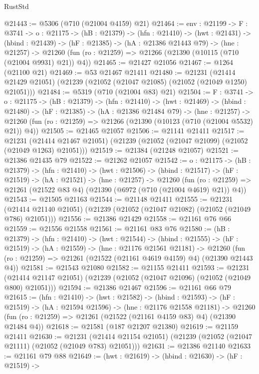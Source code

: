 \begin{lexlean}{RustStd}
\begin{coremodule}
@21443 := @5306 (@710 (@21004 @4159) @21)
@21464 := {env : @21199} ->
  {F : @3741} ->
  {o : @21175} ->
  (hB : @21379) ->
  (hfn : @21410) ->
  (hwt : @21431) ->
  (hbind : @21439) ->
  (hF : @21385) ->
  (hA : @21386 @21443 @79) ->
  (hne : @21257) ->
  @21260 (fun (ro : @21259) => @21266 (@21390 (@10115 (@710 (@21004 @9931) @21)) @4))
@21465 := @21427 @21056
@21467 := @1264 (@21100 @21)
@21469 := @53 @21467 @21411
@21480 := @21231
    (@21414 @21429 @21051)
    (@21239 (@21052 (@21047 @21085) (@21052 (@21049 @1250) @21051)))
@21484 := @5319 (@710 (@21004 @83) @21)
@21504 := {F : @3741} ->
  {o : @21175} ->
  (hB : @21379) ->
  (hfn : @21410) ->
  (hwt : @21469) ->
  (hbind : @21480) ->
  (hF : @21385) ->
  (hA : @21386 @21484 @79) ->
  (hne : @21257) ->
  @21260 (fun (ro : @21259) => @21266 (@21390 (@10123 (@710 (@21004 @5532) @21)) @4))
@21505 := @21465 @21057
@21506 := @21141 @21411
@21517 := @21231
    (@21414 @21467 @21051)
    (@21239 (@21052 (@21047 @21099) (@21052 (@21049 @1263) @21051)))
@21519 := @21384 (@21248 @21057)
@21521 := @21386 @21435 @79
@21522 := @21262 @21057
@21542 := {o : @21175} ->
  (hB : @21379) ->
  (hfn : @21410) ->
  (hwt : @21506) ->
  (hbind : @21517) ->
  (hF : @21519) ->
  (hA : @21521) ->
  (hne : @21257) ->
  @21260 (fun (ro : @21259) => @21261 (@21522 @83 @4) (@21390 (@6972 (@710 (@21004 @4619) @21)) @4))
@21543 := @21505 @21163
@21544 := @21148 @21411
@21555 := @21231
    (@21414 @21140 @21051)
    (@21239 (@21052 (@21047 @21082) (@21052 (@21049 @786) @21051)))
@21556 := @21386 @21429
@21558 := @21161 @76 @66
@21559 := @21556 @21558
@21561 := @21161 @83 @76
@21580 := (hB : @21379) ->
  (hfn : @21410) ->
  (hwt : @21544) ->
  (hbind : @21555) ->
  (hF : @21519) ->
  (hA : @21559) ->
  (hne : @21176 @21561 @21181) ->
  @21260 (fun (ro : @21259) => @21261 (@21522 (@21161 @4619 @4159) @4) (@21390 @21443 @4))
@21581 := @21543 @21080
@21582 := @21155 @21411
@21593 := @21231
    (@21414 @21147 @21051)
    (@21239 (@21052 (@21047 @21096) (@21052 (@21049 @800) @21051)))
@21594 := @21386 @21467
@21596 := @21161 @66 @79
@21615 := (hfn : @21410) ->
  (hwt : @21582) ->
  (hbind : @21593) ->
  (hF : @21519) ->
  (hA : @21594 @21596) ->
  (hne : @21176 @21558 @21181) ->
  @21260 (fun (ro : @21259) => @21261 (@21522 (@21161 @4159 @83) @4) (@21390 @21484 @4))
@21618 := @21581 (@187 @21207 @21380)
@21619 := @21159 @21411
@21630 := @21231
    (@21414 @21154 @21051)
    (@21239 (@21052 (@21047 @21111) (@21052 (@21049 @783) @21051)))
@21631 := @21386 @21140
@21633 := @21161 @79 @88
@21649 := (hwt : @21619) ->
  (hbind : @21630) ->
  (hF : @21519) ->

\end{coremodule}
\end{lexlean}
